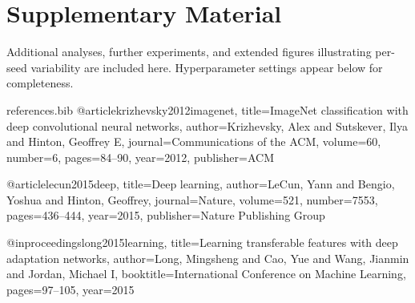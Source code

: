 \documentclass{article}
\begin{document}
\appendix
\section{Supplementary Material}
Additional analyses, further experiments, and extended figures illustrating per-seed variability are included here. Hyperparameter settings appear below for completeness.

\begin{filecontents}{references.bib}
@article{krizhevsky2012imagenet,
  title={ImageNet classification with deep convolutional neural networks},
  author={Krizhevsky, Alex and Sutskever, Ilya and Hinton, Geoffrey E},
  journal={Communications of the ACM},
  volume={60},
  number={6},
  pages={84--90},
  year={2012},
  publisher={ACM}
}

@article{lecun2015deep,
  title={Deep learning},
  author={LeCun, Yann and Bengio, Yoshua and Hinton, Geoffrey},
  journal={Nature},
  volume={521},
  number={7553},
  pages={436--444},
  year={2015},
  publisher={Nature Publishing Group}
}

@inproceedings{long2015learning,
  title={Learning transferable features with deep adaptation networks},
  author={Long, Mingsheng and Cao, Yue and Wang, Jianmin and Jordan, Michael I},
  booktitle={International Conference on Machine Learning},
  pages={97--105},
  year={2015}
}
\end{filecontents}



\end{document}
